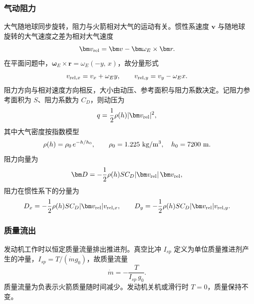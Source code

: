 \documentclass[withoutpreface,bwprint]{cumcmthesis}
\begin{document}
\subsubsection{气动阻力}
大气随地球同步旋转，阻力与火箭相对大气的运动有关。惯性系速度 $\bm v$ 与随地球旋转的大气速度之差为相对大气速度
\begin{equation}
\bm v_{\rm rel}=\bm v-\bm\omega_E\times\bm r.
\label{eq:vrel}
\end{equation}
在平面问题中，$\bm\omega_E\times\bm r=\omega_E(-y,\,x)$，故分量形式
\begin{equation}
v_{{\rm rel},x}=v_x+\omega_E y,\qquad v_{{\rm rel},y}=v_y-\omega_E x.
\label{eq:vrelcomp}
\end{equation}
阻力方向与相对速度方向相反，大小由动压、参考面积与阻力系数决定。记阻力参考面积为 $S$、阻力系数为 $C_D$，则动压为
\begin{equation}
q=\frac{1}{2}\rho(h)|\bm v_{\rm rel}|^{2},
\label{eq:dynq}
\end{equation}
其中大气密度按指数模型
\begin{equation}
\rho(h)=\rho_0\,e^{-h/h_0},\qquad \rho_0=1.225\ {\rm kg/m^3},\quad h_0=7200\ {\rm m}.
\label{eq:atmo}
\end{equation}
阻力向量为
\begin{equation}
\bm D=-\frac{1}{2}\rho(h)SC_D|\bm v_{\rm rel}|\,\bm v_{\rm rel},
\label{eq:drag}
\end{equation}
阻力在惯性系下的分量为
\begin{equation}
D_{x}=-\frac{1}{2}\rho(h)SC_D|\bm v_{\rm rel}|v_{{\rm rel},x},\qquad
D_{y}=-\frac{1}{2}\rho(h)SC_D|\bm v_{\rm rel}|v_{{\rm rel},y}.
\label{eq:dragcomp}
\end{equation}

\subsubsection{质量流出}
发动机工作时以恒定质量流量排出推进剂。真空比冲 $I_{sp}$ 定义为单位质量推进剂产生的冲量，$I_{sp}=T/(\dot m g_0)$，故质量流量
\begin{equation}
\dot m=-\frac{T}{I_{sp}\,g_0}.
\label{eq:massflow}
\end{equation}
质量流量为负表示火箭质量随时间减少。发动机关机或滑行时 $T=0$，质量保持不变。
\end{document}
